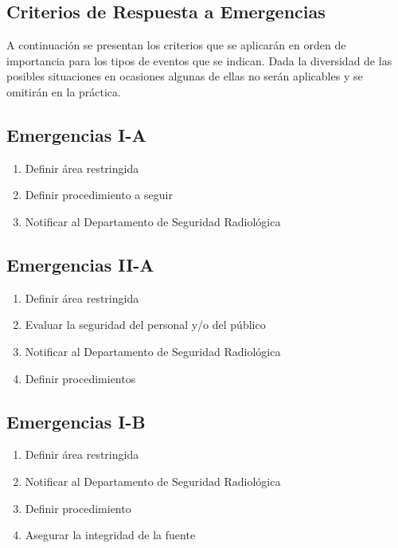 \subsection*{Criterios de Respuesta a Emergencias}

A continuación se presentan los criterios que se aplicarán en orden de importancia para los tipos de eventos que se indican. Dada la diversidad de las posibles situaciones en ocasiones algunas de ellas no serán aplicables y se omitirán en la práctica.

\subsection*{Emergencias I-A}
\begin{enumerate}
    \item Definir área restringida
    \item Definir procedimiento a seguir
    \item Notificar al Departamento de Seguridad Radiológica
\end{enumerate}

\subsection*{Emergencias II-A}
\begin{enumerate}
    \item Definir área restringida
    \item Evaluar la seguridad del personal y/o del público
    \item Notificar al Departamento de Seguridad Radiológica
    \item Definir procedimientos
\end{enumerate}

\subsection*{Emergencias I-B}
\begin{enumerate}
    \item Definir área restringida
    \item Notificar al Departamento de Seguridad Radiológica
    \item Definir procedimiento
    \item Asegurar la integridad de la fuente
\end{enumerate}
